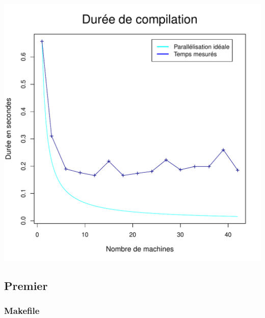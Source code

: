 \documentclass[a4paper, 11pt, titlepage]{article}
\begin{document}
\begin{center}
    \includegraphics[scale=0.6]{res/sujet_makefiles_matrix_Makefile_nth8.pdf}
\end{center}


\subsection {Premier}

\subsubsection {Makefile}
\end{document}

